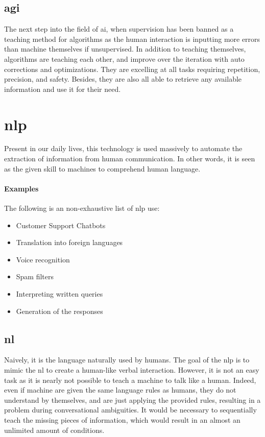 \subsection{\gls{agi}}
The next step into the field of \gls{ai}, when supervision has been banned as a teaching method for algorithms as the human interaction is inputting more errors than machine themselves if unsupervised. In addition to teaching themselves, algorithms are teaching each other, and improve over the iteration with auto corrections and optimizations. They are excelling at all tasks requiring repetition, precision, and safety. Besides, they are also all able to retrieve any available information and use it for their need. 


\section{\gls{nlp}}
Present in our daily lives, this technology is used massively to automate the extraction of information from human communication. In other words, it is seen as the given skill to machines to comprehend human language.

\paragraph{Examples}
The following is an non-exhaustive list of \gls{nlp} use:
\begin{itemize}
    \setlength\itemsep{0em}
    \item Customer Support Chatbots
    \item Translation into foreign languages
    \item Voice recognition
    \item Spam filters
    \item Interpreting written queries
    \item Generation of the responses
\end{itemize}

\subsection{\gls{nl}}
Naively, it is the language naturally used by humans. The goal of the \gls{nlp} is to mimic the \gls{nl} to create a human-like verbal interaction. However, it is not an easy task as it is nearly not possible to teach a machine to talk like a human. Indeed, even if machine are given the same language rules as humans, they do not understand by themselves, and are just applying the provided rules, resulting in a problem during conversational ambiguities. It would be necessary to sequentially teach the missing pieces of information, which would result in an almost an unlimited amount of conditions.

